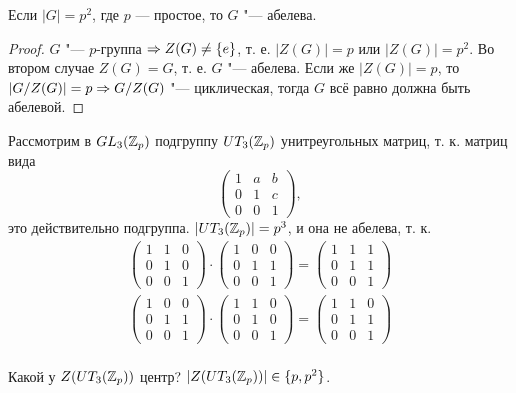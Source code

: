 \documentclass[main]{subfiles}
\begin{document}
\begin{corollary}
  Если \( |G| = p^2 \), где \( p \) --- простое,
  то \( G \) "--- абелева.
\end{corollary}
\begin{proof}
  \( G \) "--- \( p \)-группа \( \Rightarrow Z(G) \ne \{ e \} \),
  т. е. \( |Z(G)| = p \) или \( |Z(G)| = p^2 \).
  Во втором случае \( Z(G) = G \),
  т. е. \( G \) "--- абелева.
  Если же \( |Z(G)| = p \), то
  \( |\Factor{G}[Z(G)]| = p \To \Factor{G}[Z(G)] \) "---
  циклическая, тогда \( G \) всё равно должна быть абелевой.
\end{proof}

\begin{example}
  Рассмотрим в \( GL_3(\mathbb{Z}_p) \)
  подгруппу \( UT_3(\mathbb{Z}_p) \)
  унитреугольных матриц, т. к. матриц вида
  \[
    \begin{pmatrix}
      1 & a & b \\
      0 & 1 & c \\
      0 & 0 & 1
    \end{pmatrix},
  \]
  это действительно подгруппа.
  \( |UT_3(\mathbb{Z}_p)| = p^3 \),
  и она не абелева, т. к.
  \begin{gather}
    \begin{pmatrix}
      1 & 1 & 0 \\
      0 & 1 & 0 \\
      0 & 0 & 1
    \end{pmatrix} 
    \cdot
    \begin{pmatrix}
      1 & 0 & 0 \\
      0 & 1 & 1 \\
      0 & 0 & 1
    \end{pmatrix} 
    =
    \begin{pmatrix}
      1 & 1 & 1 \\
      0 & 1 & 1 \\
      0 & 0 & 1
    \end{pmatrix} \\
    \begin{pmatrix}
      1 & 0 & 0 \\
      0 & 1 & 1 \\
      0 & 0 & 1
    \end{pmatrix} 
    \cdot
    \begin{pmatrix}
      1 & 1 & 0 \\
      0 & 1 & 0 \\
      0 & 0 & 1
    \end{pmatrix} 
    =
    \begin{pmatrix}
      1 & 1 & 0 \\
      0 & 1 & 1 \\
      0 & 0 & 1
    \end{pmatrix} \\
  \end{gather}
\end{example}

\begin{exercise}
  Какой у \( Z(UT_3(\mathbb{Z}_p)) \) центр?
  \( |Z(UT_3(\mathbb{Z}_p))| \in \{ p, p^2 \} \).
\end{exercise}
\end{document}
